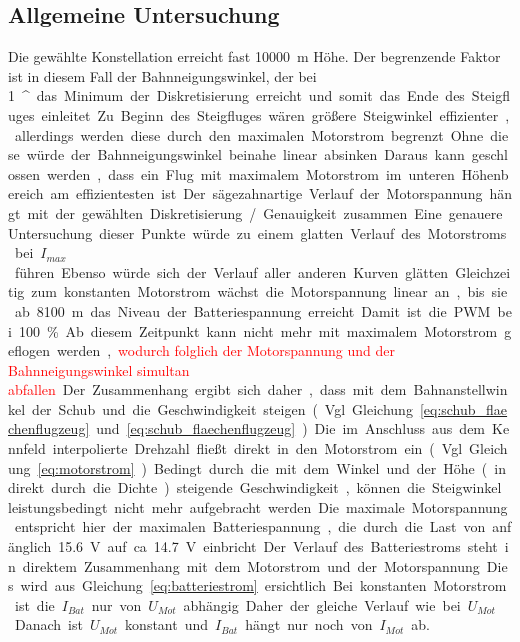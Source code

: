 \subsection{Allgemeine Untersuchung}
Die gewählte Konstellation erreicht fast \SI{10000}{m} Höhe. Der begrenzende Faktor ist in diesem Fall der Bahnneigungswinkel, der bei \SI{1}{^\circ} das Minimum der Diskretisierung erreicht und somit das Ende des Steigfluges einleitet. Zu Beginn des Steigfluges wären größere Steigwinkel effizienter, allerdings werden diese durch den maximalen Motorstrom begrenzt. Ohne diese würde der Bahnneigungswinkel beinahe linear absinken. Daraus kann geschlossen werden, dass ein Flug mit maximalem Motorstrom im unteren Höhenbereich am effizientesten ist. Der sägezahnartige Verlauf der Motorspannung hängt mit der gewählten Diskretisierung / Genauigkeit zusammen. Eine genauere Untersuchung dieser Punkte würde zu einem glatten Verlauf des Motorstroms bei \ensuremath{I_{max}} führen. Ebenso würde sich der Verlauf aller anderen Kurven glätten. Gleichzeitig zum konstanten Motorstrom wächst die Motorspannung linear an, bis sie ab \SI{8100}{m} das Niveau der Batteriespannung erreicht. Damit ist die PWM bei \SI{100}{\%}. Ab diesem Zeitpunkt kann nicht mehr mit maximalem Motorstrom geflogen werden, \textcolor{red}{wodurch folglich der Motorspannung und der Bahnneigungswinkel simultan abfallen}. Der Zusammenhang ergibt sich daher, dass mit dem Bahnanstellwinkel der Schub und die Geschwindigkeit steigen (Vgl. Gleichung \ref{eq:schub_flaechenflugzeug} und \ref{eq:schub_flaechenflugzeug}). Die im Anschluss aus dem Kennfeld interpolierte Drehzahl fließt direkt in den Motorstrom ein (Vgl. Gleichung \ref{eq:motorstrom}). Bedingt durch die mit dem Winkel und der Höhe (indirekt durch die Dichte) steigende Geschwindigkeit, können die Steigwinkel leistungsbedingt nicht mehr aufgebracht werden. Die maximale Motorspannung entspricht hier der maximalen Batteriespannung, die durch die Last von anfänglich \SI{15,6}{V} auf ca. \SI{14.7}{V} einbricht. Der Verlauf des Batteriestroms steht in direktem Zusammenhang mit dem Motorstrom und der Motorspannung. Dies wird aus Gleichung \ref{eq:batteriestrom} ersichtlich. Bei konstanten Motorstrom ist die \ensuremath{I_{Bat}} nur von \ensuremath{U_{Mot}} abhängig. Daher der gleiche Verlauf wie bei \ensuremath{U_{Mot}}. Danach ist \ensuremath{U_{Mot}} konstant und \ensuremath{I_{Bat}} hängt nur noch von \ensuremath{I_{Mot}} ab.



